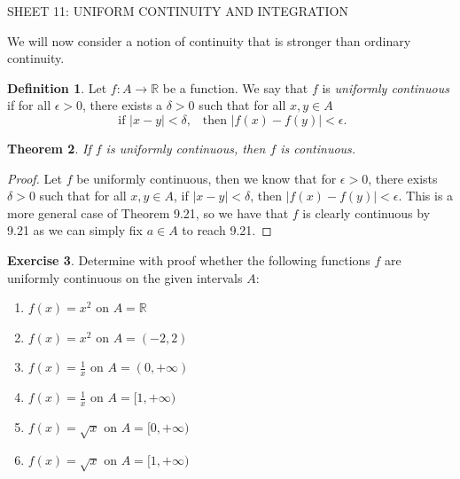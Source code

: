 \documentclass[12pt]{article}
\newcommand{\bbR}{\mathbb{R}}
\providecommand{\abs}[1]{\lvert #1 \rvert}
\providecommand{\arr}{\longrightarrow}
\renewcommand{\_}[1]{\underline{ #1 }}
\newtheorem{theorem}{Theorem}[section]
\theoremstyle{definition}
\newtheorem{definition}[theorem]{Definition}
\newtheorem{exercise}[theorem]{Exercise}
\numberwithin{equation}{subsection}
\begin{document}
\begin{center}
{\large SHEET 11: UNIFORM CONTINUITY AND INTEGRATION} \\ 
\end{center}

\bigskip \bigskip


\setcounter{section}{11}   

We will now consider a notion of continuity that is stronger than ordinary continuity.  

\begin{definition}  Let $f \colon A \arr \bbR$ be a function.  We say that $f$ is \emph{uniformly continuous} if for all $\epsilon > 0$, there exists a $\delta > 0$ such that for all $x, y \in A$
\[
\text{ if $\abs{x - y} < \delta$,} \quad \text{then $\abs{f(x) - f(y)} < \epsilon$.}
\]
\end{definition}

\begin{theorem}  If $f$ is uniformly continuous, then $f$ is continuous.
\end{theorem}

\begin{proof}
Let $f$ be uniformly continuous, then we know that for $\epsilon > 0$, there exists $\delta > 0$ such that for all $x,y \in A$, if $\abs{x - y} < \delta$, then $\abs{f(x) - f(y)} < \epsilon$. This is a more general case of Theorem 9.21, so we have that $f$ is clearly continuous by 9.21 as we can simply fix $a \in A$ to reach 9.21.
\end{proof}

\begin{exercise}  
Determine with proof whether the following functions $f$ are uniformly continuous on the given
intervals $A$:
\begin{enumerate}
\item
$f(x)=x^2$ on $A=\bbR$

\item
$f(x)=x^2$ on $A=(-2,2)$

\item
$f(x)=\frac{1}{x}$ on $A=(0,+\infty)$

\item
$f(x)=\frac{1}{x}$ on $A=[1,+\infty)$

\item
$f(x)=\sqrt{x}$ on $A=[0,+\infty)$

\item
$f(x)=\sqrt{x}$ on $A=[1,+\infty)$
\end{enumerate}
\end{exercise}
\end{document}
